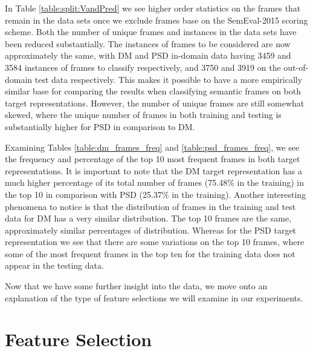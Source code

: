 In Table \ref{table:split:VandPred} we see higher order statistics on the frames that remain in the data sets once we exclude frames base on the SemEval-2015 scoring scheme. Both the number of unique frames and instances in the data sets have been reduced substantially. The instances of frames to be considered are now approximately the same, with DM and PSD in-domain data having 3459 and 3584 instances of frames to classify respectively, and 3750 and 3919 on the out-of-domain test data respectively. This makes it possible to have a more empirically similar base for comparing the results when classifying semantic frames on both target representations. However, the number of unique frames are still somewhat skewed, where the unique number of frames in both training and testing is substantially higher for PSD in comparison to DM.

Examining Tables \ref{table:dm_frames_freq} and \ref{table:psd_frames_freq}, we see the frequency and percentage of the top 10 most frequent frames in both target representations. It is important to note that the DM target representation has a much higher percentage of its total number of frames (75.48\% in the training) in the top 10 in comparison with PSD (25.37\% in the training). Another interesting phenomena to notice is that the distribution of frames in the training and test data for DM has a very similar distribution. The top 10 frames are the same, approximately similar percentages of distribution. Whereas for the PSD target representation we see that there are some variations on the top 10 frames, where some of the most frequent frames in the top ten for the training data does not appear in the testing data.

Now that we have some further insight into the data, we move onto an explanation of the type of feature selections we will examine in our experiments. 

\section{Feature Selection}
\label{features}

